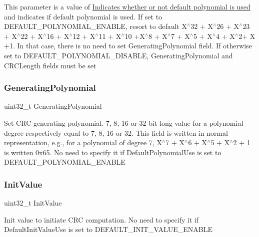 This parameter is a value of \hyperlink{group___c_r_c___default___polynomial}{Indicates whether or not default polynomial is used} and indicates if default polynomial is used. If set to D\+E\+F\+A\+U\+L\+T\+\_\+\+P\+O\+L\+Y\+N\+O\+M\+I\+A\+L\+\_\+\+E\+N\+A\+B\+LE, resort to default X$^\wedge$32 + X$^\wedge$26 + X$^\wedge$23 + X$^\wedge$22 + X$^\wedge$16 + X$^\wedge$12 + X$^\wedge$11 + X$^\wedge$10 +\+X$^\wedge$8 + X$^\wedge$7 + X$^\wedge$5 + X$^\wedge$4 + X$^\wedge$2+ X +1. In that case, there is no need to set Generating\+Polynomial field. If otherwise set to D\+E\+F\+A\+U\+L\+T\+\_\+\+P\+O\+L\+Y\+N\+O\+M\+I\+A\+L\+\_\+\+D\+I\+S\+A\+B\+LE, Generating\+Polynomial and C\+R\+C\+Length fields must be set \mbox{\label{struct_c_r_c___init_type_def_a8eba50c4d083261700ecd9fdf9906124}} 
\subsubsection{\texorpdfstring{Generating\+Polynomial}{GeneratingPolynomial}}
{\footnotesize\ttfamily uint32\+\_\+t Generating\+Polynomial}

Set C\+RC generating polynomial. 7, 8, 16 or 32-\/bit long value for a polynomial degree respectively equal to 7, 8, 16 or 32. This field is written in normal representation, e.\+g., for a polynomial of degree 7, X$^\wedge$7 + X$^\wedge$6 + X$^\wedge$5 + X$^\wedge$2 + 1 is written 0x65. No need to specify it if Default\+Polynomial\+Use is set to D\+E\+F\+A\+U\+L\+T\+\_\+\+P\+O\+L\+Y\+N\+O\+M\+I\+A\+L\+\_\+\+E\+N\+A\+B\+LE \mbox{\label{struct_c_r_c___init_type_def_ac60396fcb8285f785650dc65530d9077}} 
\subsubsection{\texorpdfstring{Init\+Value}{InitValue}}
{\footnotesize\ttfamily uint32\+\_\+t Init\+Value}

Init value to initiate C\+RC computation. No need to specify it if Default\+Init\+Value\+Use is set to D\+E\+F\+A\+U\+L\+T\+\_\+\+I\+N\+I\+T\+\_\+\+V\+A\+L\+U\+E\+\_\+\+E\+N\+A\+B\+LE \mbox{\label{struct_c_r_c___init_type_def_ae78b0467ba2913d30b23dd7e30c2f87e}} 
